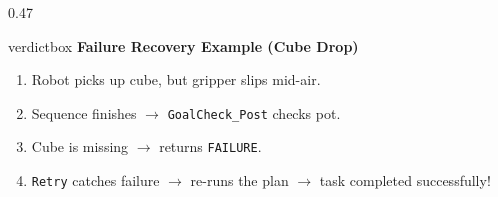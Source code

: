 \documentclass[10pt]{beamer}
\begin{document}
\begin{frame}[fragile]
\begin{columns}[T]
\begin{column}{0.47\textwidth}
        \vspace{0.12cm}
        \begin{beamercolorbox}[sep=4pt,shadow=true,rounded=true]{verdictbox}
            \scriptsize \textbf{Failure Recovery Example (Cube Drop)} \\
            \tiny
            \begin{enumerate}
                \tiny
                \item Robot picks up cube, but gripper slips mid-air.
                \item Sequence finishes $\to$ \texttt{GoalCheck\_Post} checks pot.
                \item Cube is missing $\to$ returns \texttt{FAILURE}.
                \item \texttt{Retry} catches failure $\to$ re-runs the plan $\to$ task completed successfully!
            \end{enumerate}
        \end{beamercolorbox}
    \end{column}
\end{columns}
\end{frame}
\end{document}
